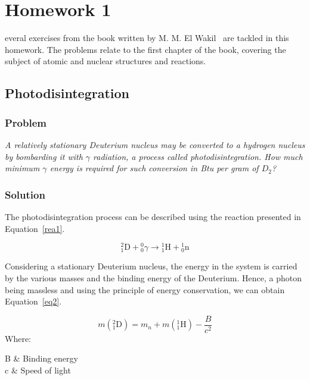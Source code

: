 %
%
\let\textcircled=\pgftextcircled
\chapter{Homework 1}
\label{chap:intro}

everal exercises from the book written by M. M. El Wakil~\cite{book01} are tackled in this homework. The problems relate to the first chapter of the book, covering the subject of atomic and nuclear structures and reactions.

\section{Photodisintegration}
\label{sec:prob1}

\subsection{Problem}
\textit{A relatively stationary Deuterium nucleus may be converted to a hydrogen nucleus by bombarding it with $\gamma$ radiation, a process called photodisintegration. How much minimum $\gamma$ energy is required for such conversion in Btu per gram of $D_2$?}

\subsection{Solution}

The photodisintegration process can be described using the reaction presented in Equation~\ref{rea1}.

\begin{equation}\label{rea1}
{}^2_1\textrm{D} + {}^{0}_{0}\gamma \to {}^{1}_{1}\textrm{H} + {}^1_0\textrm{n}
\end{equation}

Considering a stationary Deuterium nucleus, the energy in the system is carried by the various masses and the binding energy of the Deuterium. Hence, a photon being massless and using the principle of energy conservation, we can obtain Equation~\ref{eq2}.

\begin{equation}\label{eq2}
m({}^2_1\textrm{D}) = m_n + m({}^{1}_{1}\textrm{H}) - \frac{B}{c^2}
\end{equation}
Where:

\begin{conditions}
 B      &  Binding energy \\
 c      & Speed of light
\end{conditions}

